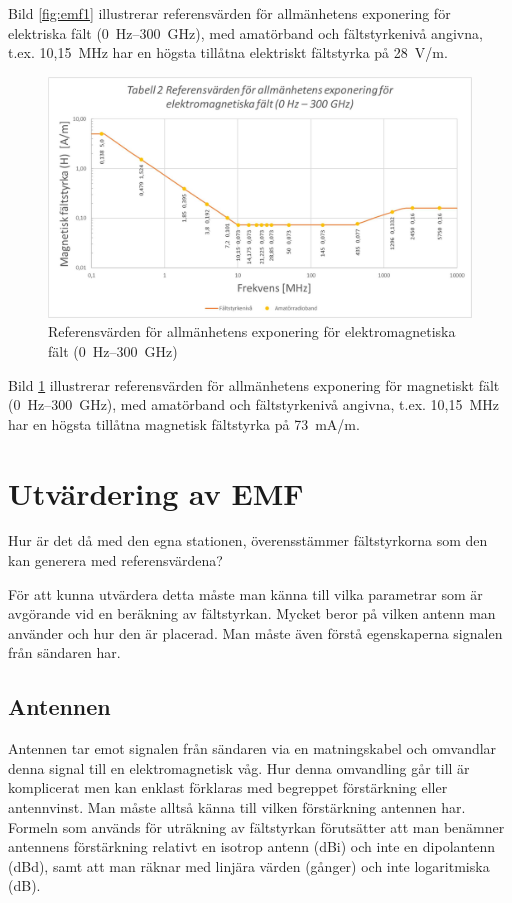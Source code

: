 Bild \ref{fig:emf1} illustrerar referensvärden för allmänhetens
exponering för elektriska fält (0~Hz--300~GHz), med amatörband
och fältstyrkenivå angivna, t.ex. 10,15~MHz har en högsta tillåtna
elektriskt fältstyrka på 28~V/m.

\begin{figure}[ht]
\begin{center}
\includegraphics[width=14cm]{images/emfbild-001}
\caption{Referensvärden för allmänhetens exponering för elektromagnetiska fält (0~Hz--300~GHz)}
\label{fig:emf2}
\end{center}
\end{figure}

Bild \ref{fig:emf2} illustrerar referensvärden för allmänhetens
exponering för magnetiskt fält (0~Hz--300~GHz), med amatörband
och fältstyrkenivå angivna, t.ex. 10,15~MHz har en högsta tillåtna
magnetisk fältstyrka på 73~mA/m.

\section{Utvärdering av EMF}

Hur är det då med den egna stationen, överensstämmer fältstyrkorna som
den kan generera med referensvärdena?

För att kunna utvärdera detta måste man känna till vilka parametrar
som är avgörande vid en beräkning av fältstyrkan.
Mycket beror på vilken antenn man använder och hur den är placerad.
Man måste även förstå egenskaperna signalen från sändaren har.

\subsection{Antennen}

Antennen tar emot signalen från sändaren via en matningskabel och
omvandlar denna signal till en elektromagnetisk våg.
Hur denna omvandling går till är komplicerat men kan enklast förklaras med
begreppet förstärkning eller antennvinst.
Man måste alltså känna till vilken förstärkning antennen har.
Formeln som används för uträkning av fältstyrkan förutsätter att man benämner
antennens förstärkning relativt en isotrop antenn (dBi) och inte en dipolantenn
(dBd), samt att man räknar med linjära värden (gånger) och inte
logaritmiska (dB).


